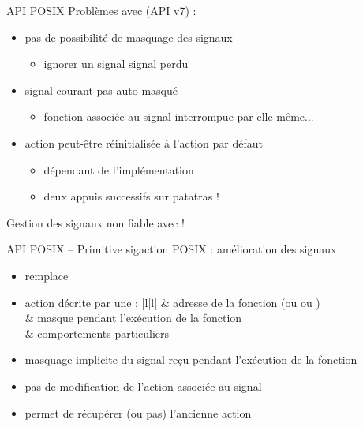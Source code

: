 \begin {frame} {API POSIX}
    Problèmes avec  (API v7) :

    \begin {itemize}
	\item pas de possibilité de masquage des signaux
	    \begin {itemize}
		\item ignorer un signal \implique signal perdu
	    \end {itemize}
	\item signal courant pas auto-masqué
	    \begin {itemize}
		\item fonction associée au signal interrompue par
		    elle-même...
	    \end {itemize}
	\item action peut-être réinitialisée à l'action par défaut
	    \begin {itemize}
		\item dépendant de l'implémentation
		\item deux appuis successifs sur
		     \implique patatras !
	    \end {itemize}
    \end {itemize}

    \vspace* {3mm}

    Gestion des signaux non fiable avec  !
\end {frame}

\begin {frame} {API POSIX -- Primitive sigaction}
    POSIX : amélioration des signaux


    \begin {itemize}
	\item {} remplace 
	\item action décrite par une  :
	    \ctableau {\fC} {|l|l|} {
		\rca {}
		    & adresse de la fonction (ou  ou
			)
		    \\
		\rcb {}
		    & masque pendant l'exécution de la fonction
		    \\
		\rca {}
		    & comportements particuliers
		    \\
	    }

	    \vspace* {1mm}

	\item masquage implicite du signal reçu pendant l'exécution
	    de la fonction
	\item pas de modification de l'action associée au signal
	\item permet de récupérer (ou pas) l'ancienne action
    \end {itemize}
\end {frame}

